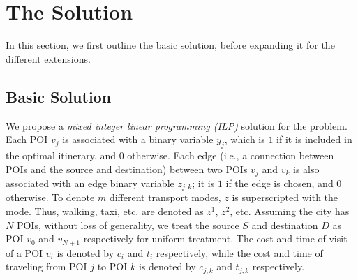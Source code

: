 \section{The \trip Solution}
\label{sec:ilp}

In this section, we first outline the basic solution, before expanding it for
the different extensions.

\subsection{Basic Solution}
\label{sec:basic}

We propose a \emph{mixed integer linear programming (ILP)} solution for
the \trip problem.  Each POI $v_{j}$ is associated with a binary
variable $y_{j}$, which is $1$ if it is included in the optimal
itinerary, and $0$ otherwise.  Each edge (i.e., a connection between
POIs and the source and destination) between two POIs $v_{j}$ and
$v_{k}$ is also associated with an edge binary variable $z_{j,k}$; it is
$1$ if the edge is chosen, and $0$ otherwise.  To denote $m$ different
transport modes, $z$ is superscripted with the mode.  Thus, walking,
taxi, etc. are denoted as $z^1$, $z^2$, etc.  Assuming the city has $N$
POIs, without loss of generality, we treat the source $S$ and
destination $D$ as POI $v_{0}$ and $v_{{N+1}}$ respectively for uniform
treatment.  The cost and time of visit of a POI $v_i$ is denoted by
$c_i$ and $t_i$ respectively, while the cost and time of traveling from
POI $j$ to POI $k$ is denoted by $c_{j,k}$ and $t_{j,k}$ respectively.

